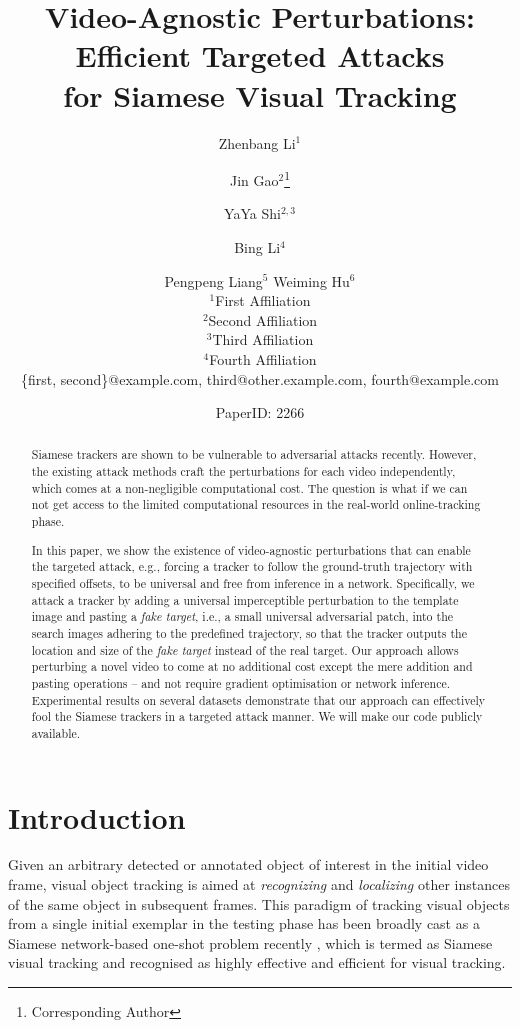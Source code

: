 \documentclass{article}
\title{Video-Agnostic Perturbations: Efficient Targeted Attacks \\ for Siamese Visual Tracking}
\author{
Zhenbang Li$^1$\and
Jin Gao$^2$\footnote{Corresponding Author}\and
YaYa Shi$^{2,3}$\and
Bing Li$^4$\and
Pengpeng Liang$^5$\And
Weiming Hu$^6$\\
\affiliations
$^1$First Affiliation\\
$^2$Second Affiliation\\
$^3$Third Affiliation\\
$^4$Fourth Affiliation\\
\emails
\{first, second\}@example.com,
third@other.example.com,
fourth@example.com
}
\author{PaperID: 2266}
\begin{document}
\maketitle

\begin{abstract}

Siamese trackers are shown to be vulnerable to adversarial attacks recently. However, the existing attack methods craft the perturbations for each video independently, which comes at a non-negligible computational cost. The question is what if we can not get access to the limited computational resources in the real-world online-tracking phase.

In this paper, we show the existence of video-agnostic perturbations that can enable the targeted attack, e.g., forcing a tracker to follow the ground-truth trajectory with specified offsets, to be universal and free from inference in a network. Specifically, we attack a tracker by adding a universal imperceptible perturbation to the template image and pasting a \textit{fake target}, i.e., a small universal adversarial patch, into the search images adhering to the predefined trajectory, so that the tracker outputs the location and size of the \textit{fake target} instead of the real target. Our approach allows perturbing a novel video to come at no additional cost except the mere addition and pasting operations -- and not require gradient optimisation or network inference. Experimental results on several datasets demonstrate that our approach can effectively fool the Siamese trackers in a targeted attack manner. We will make our code publicly available.

\end{abstract}

\section{Introduction}

Given an arbitrary detected or annotated object of interest in the initial video frame, visual object tracking is aimed at {\it recognizing} and {\it localizing} other instances of the same object in subsequent frames. This paradigm of tracking visual objects from a single initial exemplar in the testing phase has been broadly cast as a Siamese network-based one-shot problem recently \cite{SiamFC,SiamRPN,SiamRPN++,SiamFC++}, which is termed as Siamese visual tracking and recognised as highly effective and efficient for visual tracking.
\end{document}
